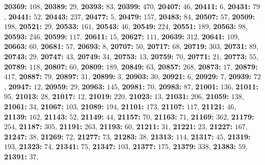 \textsf{\bfseries 20369:} $108$, \textsf{\bfseries 20389:} $29$, \textsf{\bfseries 20393:} $83$, \textsf{\bfseries 20399:} $470$, \textsf{\bfseries 20407:} $46$, \textsf{\bfseries 20411:} $6$, \textsf{\bfseries 20431:} $79$, \textsf{\bfseries 20441:} $52$, \textsf{\bfseries 20443:} $237$, \textsf{\bfseries 20477:} $5$, \textsf{\bfseries 20479:} $157$, \textsf{\bfseries 20483:} $84$, \textsf{\bfseries 20507:} $57$, \textsf{\bfseries 20509:} $198$, \textsf{\bfseries 20521:} $29$, \textsf{\bfseries 20533:} $161$, \textsf{\bfseries 20543:} $46$, \textsf{\bfseries 20549:} $224$, \textsf{\bfseries 20551:} $189$, \textsf{\bfseries 20563:} $98$, \textsf{\bfseries 20593:} $246$, \textsf{\bfseries 20599:} $117$, \textsf{\bfseries 20611:} $15$, \textsf{\bfseries 20627:} $111$, \textsf{\bfseries 20639:} $312$, \textsf{\bfseries 20641:} $109$, \textsf{\bfseries 20663:} $60$, \textsf{\bfseries 20681:} $57$, \textsf{\bfseries 20693:} $8$, \textsf{\bfseries 20707:} $50$, \textsf{\bfseries 20717:} $68$, \textsf{\bfseries 20719:} $303$, \textsf{\bfseries 20731:} $89$, \textsf{\bfseries 20743:} $29$, \textsf{\bfseries 20747:} $43$, \textsf{\bfseries 20749:} $34$, \textsf{\bfseries 20753:} $13$, \textsf{\bfseries 20759:} $70$, \textsf{\bfseries 20771:} $21$, \textsf{\bfseries 20773:} $55$, \textsf{\bfseries 20789:} $118$, \textsf{\bfseries 20807:} $60$, \textsf{\bfseries 20809:} $189$, \textsf{\bfseries 20849:} $63$, \textsf{\bfseries 20857:} $268$, \textsf{\bfseries 20873:} $17$, \textsf{\bfseries 20879:} $417$, \textsf{\bfseries 20887:} $79$, \textsf{\bfseries 20897:} $31$, \textsf{\bfseries 20899:} $3$, \textsf{\bfseries 20903:} $30$, \textsf{\bfseries 20921:} $6$, \textsf{\bfseries 20929:} $7$, \textsf{\bfseries 20939:} $72$, \textsf{\bfseries 20947:} $12$, \textsf{\bfseries 20959:} $29$, \textsf{\bfseries 20963:} $145$, \textsf{\bfseries 20981:} $70$, \textsf{\bfseries 20983:} $87$, \textsf{\bfseries 21001:} $136$, \textsf{\bfseries 21011:} $95$, \textsf{\bfseries 21013:} $28$, \textsf{\bfseries 21017:} $12$, \textsf{\bfseries 21019:} $220$, \textsf{\bfseries 21023:} $13$, \textsf{\bfseries 21031:} $206$, \textsf{\bfseries 21059:} $138$, \textsf{\bfseries 21061:} $34$, \textsf{\bfseries 21067:} $103$, \textsf{\bfseries 21089:} $194$, \textsf{\bfseries 21101:} $173$, \textsf{\bfseries 21107:} $117$, \textsf{\bfseries 21121:} $46$, \textsf{\bfseries 21139:} $162$, \textsf{\bfseries 21143:} $52$, \textsf{\bfseries 21149:} $44$, \textsf{\bfseries 21157:} $70$, \textsf{\bfseries 21163:} $71$, \textsf{\bfseries 21169:} $362$, \textsf{\bfseries 21179:} $254$, \textsf{\bfseries 21187:} $305$, \textsf{\bfseries 21191:} $263$, \textsf{\bfseries 21193:} $60$, \textsf{\bfseries 21211:} $31$, \textsf{\bfseries 21221:} $23$, \textsf{\bfseries 21227:} $167$, \textsf{\bfseries 21247:} $38$, \textsf{\bfseries 21269:} $72$, \textsf{\bfseries 21277:} $73$, \textsf{\bfseries 21283:} $38$, \textsf{\bfseries 21313:} $114$, \textsf{\bfseries 21317:} $45$, \textsf{\bfseries 21319:} $193$, \textsf{\bfseries 21323:} $74$, \textsf{\bfseries 21341:} $75$, \textsf{\bfseries 21347:} $103$, \textsf{\bfseries 21377:} $175$, \textsf{\bfseries 21379:} $338$, \textsf{\bfseries 21383:} $59$, \textsf{\bfseries 21391:} $37$, 
